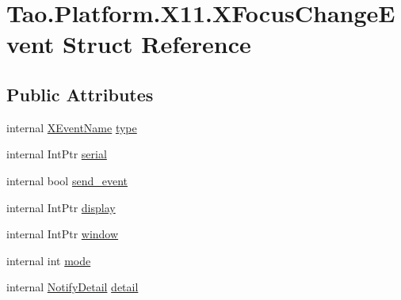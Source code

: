 \hypertarget{struct_tao_1_1_platform_1_1_x11_1_1_x_focus_change_event}{
\section{Tao.Platform.X11.XFocusChangeEvent Struct Reference}
\label{struct_tao_1_1_platform_1_1_x11_1_1_x_focus_change_event}
}
\subsection*{Public Attributes}
\begin{DoxyCompactItemize}
\item 
internal \hyperlink{namespace_tao_1_1_platform_1_1_x11_aff81ed5b8778e1ea8e872861dff9f146}{XEventName} \hyperlink{struct_tao_1_1_platform_1_1_x11_1_1_x_focus_change_event_a42da970ca7df948bf965ea4b1a7ef816}{type}
\item 
internal IntPtr \hyperlink{struct_tao_1_1_platform_1_1_x11_1_1_x_focus_change_event_a4b1d5610b7f0f0bdf914665368e07eb9}{serial}
\item 
internal bool \hyperlink{struct_tao_1_1_platform_1_1_x11_1_1_x_focus_change_event_a6e500a566f49a40f29311262595a01be}{send\_\-event}
\item 
internal IntPtr \hyperlink{struct_tao_1_1_platform_1_1_x11_1_1_x_focus_change_event_ac1779c075aa44938cb67f940764cb12e}{display}
\item 
internal IntPtr \hyperlink{struct_tao_1_1_platform_1_1_x11_1_1_x_focus_change_event_a44ce41f06ce31f8f33e3e65c0a7c3f59}{window}
\item 
internal int \hyperlink{struct_tao_1_1_platform_1_1_x11_1_1_x_focus_change_event_a482c88260b2f17f3d84306bd4ef5696a}{mode}
\item 
internal \hyperlink{namespace_tao_1_1_platform_1_1_x11_a284f97dad97b4ca8dd1e16bd10eee70c}{NotifyDetail} \hyperlink{struct_tao_1_1_platform_1_1_x11_1_1_x_focus_change_event_a5ce548b7cef942fbe0dd752ad1a05f9a}{detail}
\end{DoxyCompactItemize}


